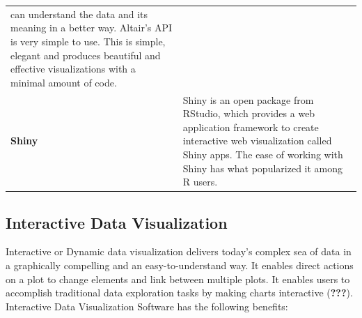 \documentclass[]{book}
\theoremstyle{definition}
\theoremstyle{definition}
\theoremstyle{definition}
\theoremstyle{remark}
\begin{document}
\begin{longtable}[]{@{}ll@{}}
\begin{minipage}[t]{0.78\columnwidth}
can understand the data and its meaning in a better way. Altair's API is
very simple to use. This is simple, elegant and produces beautiful and
effective visualizations with a minimal amount of code.\strut
\end{minipage}\tabularnewline
\begin{minipage}[t]{0.16\columnwidth}\raggedright\strut
\textbf{Shiny}\strut
\end{minipage} & \begin{minipage}[t]{0.78\columnwidth}\raggedright\strut
Shiny is an open package from RStudio, which provides a web application
framework to create interactive web visualization called Shiny apps. The
ease of working with Shiny has what popularized it among R users.\strut
\end{minipage}\tabularnewline
\bottomrule
\end{longtable}

\subsection{Interactive Data
Visualization}\label{interactive-data-visualization}

Interactive or Dynamic data visualization delivers today's complex sea
of data in a graphically compelling and an easy-to-understand way. It
enables direct actions on a plot to change elements and link between
multiple plots. It enables users to accomplish traditional data
exploration tasks by making charts interactive ({\textbf{???}}).
Interactive Data Visualization Software has the following benefits:
\end{document}
